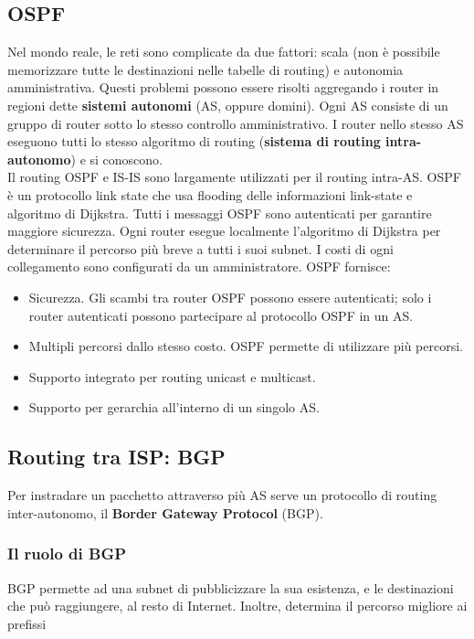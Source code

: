 \documentclass[11pt]{article}
\begin{document}
\subsection{OSPF}
Nel mondo reale, le reti sono complicate da due fattori: scala (non è possibile memorizzare tutte le destinazioni nelle 
tabelle di routing) e autonomia amministrativa. Questi problemi possono essere risolti aggregando i router in regioni 
dette \textbf{sistemi autonomi} (AS, oppure domini). Ogni AS consiste di un gruppo di router sotto lo stesso controllo 
amministrativo. I router nello stesso AS eseguono tutti lo stesso algoritmo di routing (\textbf{sistema di routing intra-autonomo})
e si conoscono.\\
Il routing OSPF e IS-IS sono largamente utilizzati per il routing intra-AS. OSPF è un protocollo link state che usa flooding 
delle informazioni link-state e algoritmo di Dijkstra. Tutti i messaggi OSPF sono autenticati per garantire maggiore sicurezza.
Ogni router esegue localmente l'algoritmo di Dijkstra per determinare il percorso più breve a tutti i suoi subnet. I costi 
di ogni collegamento sono configurati da un amministratore. OSPF fornisce:
\begin{itemize}
    \item Sicurezza. Gli scambi tra router OSPF possono essere autenticati; solo i router autenticati possono partecipare 
    al protocollo OSPF in un AS.
    \item Multipli percorsi dallo stesso costo. OSPF permette di utilizzare più percorsi.
    \item Supporto integrato per routing unicast e multicast.
    \item Supporto per gerarchia all'interno di un singolo AS.
\end{itemize}
\subsection{Routing tra ISP: BGP}
Per instradare un pacchetto attraverso più AS serve un protocollo di routing inter-autonomo, il \textbf{Border Gateway Protocol}
(BGP).
\subsubsection{Il ruolo di BGP}
BGP permette ad una subnet di pubblicizzare la sua esistenza, e le destinazioni che può raggiungere, al resto di Internet.
Inoltre, determina il percorso migliore ai prefissi
\end{document}
